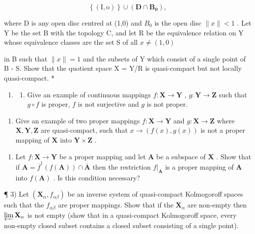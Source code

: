 \[
\left\{\left(\mathrm{I}, \mathrm{o}\right) \right\} \cup \left(\mathbf {D} \cap \mathbf {B} _ {\mathbf {0}}\right),
\]

where D is any open disc centred at (1,0) and \(B_{0}\) is the open disc \(\|x\|<1\) . Let Y be the set B with the topology C, and let R be the equivalence relation on Y whose equivalence classes are the set S of all \(x\neq(1,0)\)

in B such that \(\|x\| = 1\) and the subsets of Y which consist of a single point of B - S. Show that the quotient space X = Y/R is quasi-compact but not locally quasi-compact. *

\BourbakiExerciseGroup

\begin{enumerate}
\def\labelenumi{\arabic{enumi})}
\tightlist
\item
  \begin{enumerate}
  \def\labelenumii{\alph{enumii})}
  \tightlist
  \item
    Give an example of continuous mappings \(f: \mathbf{X} \to \mathbf{Y}\) , \(g: \mathbf{Y} \to \mathbf{Z}\) such that \(g \circ f\) is proper, \(f\) is not surjective and \(g\) is not proper.
  \end{enumerate}
\end{enumerate}

\begin{enumerate}
\def\labelenumi{\alph{enumi})}
\setcounter{enumi}{1}
\tightlist
\item
  Give an example of two proper mappings \(f: \mathbf{X} \to \mathbf{Y}\) and \(g: \mathbf{X} \to \mathbf{Z}\) where \(\mathbf{X}, \mathbf{Y}, \mathbf{Z}\) are quasi-compact, such that \(x \to (f(x), g(x))\) is not a proper mapping of \(\mathbf{X}\) into \(\mathbf{Y} \times \mathbf{Z}\) .
\end{enumerate}

\begin{enumerate}
\def\labelenumi{\arabic{enumi})}
\setcounter{enumi}{1}
\tightlist
\item
  Let \(f: \mathbf{X} \to \mathbf{Y}\) be a proper mapping and let \(\mathbf{A}\) be a subspace of \(\mathbf{X}\) . Show that if \(\mathbf{A} = \overline{f}^1(f(\mathbf{A})) \cap \overline{\mathbf{A}}\) then the restriction \(f|_{\mathbf{A}}\) is a proper mapping of \(\mathbf{A}\) into \(f(\mathbf{A})\) . Is this condition necessary?
\end{enumerate}

¶ 3) Let \((\mathbf{X}_{\alpha}, f_{\alpha\beta})\) be an inverse system of quasi-compact Kolmogoroff spaces such that the \(f_{\alpha\beta}\) are proper mappings. Show that if the \(\mathbf{X}_{\alpha}\) are non-empty then \(\varprojlim \mathbf{X}_{\alpha}\) is not empty (show that in a quasi-compact Kolmogoroff space, every non-empty closed subset contains a closed subset consisting of a single point).

